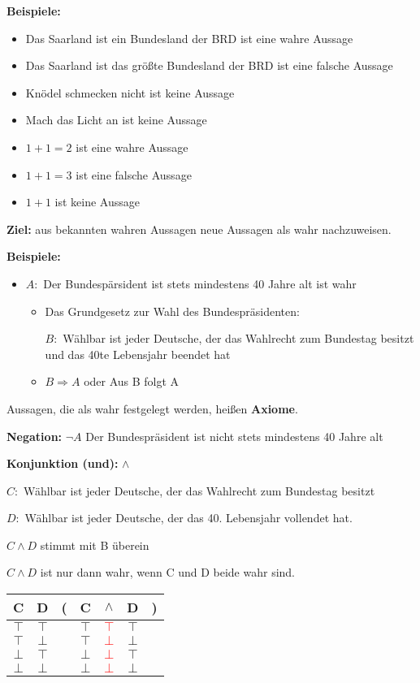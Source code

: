 \documentclass[pdftex,12pt,a4paper,fleqn]{scrartcl}
\begin{document}
\textbf{Beispiele:} 
\begin{itemize}
	\item Das Saarland ist ein Bundesland der BRD ist eine wahre Aussage
	\item Das Saarland ist das größte Bundesland der BRD ist eine falsche Aussage
	\item Knödel schmecken nicht ist keine Aussage
	\item Mach das Licht an ist  keine Aussage
	\item $1+1=2$ ist eine wahre Aussage
	\item $1+1=3$ ist eine falsche Aussage
	\item $1+1$ ist keine Aussage
\end{itemize}

\textbf{Ziel:} aus bekannten wahren Aussagen neue Aussagen als wahr nachzuweisen.

\textbf{Beispiele:}
\begin{itemize}
	\item $A:$ Der Bundespärsident ist stets mindestens 40 Jahre alt ist wahr
	\begin{itemize}
		\item Das Grundgesetz zur Wahl des Bundespräsidenten: 

		$B:$ Wählbar ist jeder Deutsche, der das Wahlrecht zum Bundestag besitzt und das 40te Lebensjahr beendet hat
		\item $B \Rightarrow A$ oder Aus B folgt A
	\end{itemize}
\end{itemize}

Aussagen, die als wahr festgelegt werden, heißen \textbf{Axiome}.

\textbf{Negation:}
$\neg A$ Der Bundespräsident ist nicht stets mindestens 40 Jahre alt

\textbf{Konjunktion (und):} $\land$ 

$C:$ Wählbar ist jeder Deutsche, der das Wahlrecht zum Bundestag besitzt

$D:$ Wählbar ist jeder Deutsche, der das 40. Lebensjahr vollendet hat.

$C \land D$ stimmt mit B überein

$C \land D$ ist nur dann wahr, wenn C und D beide wahr sind.

\begin{tabular}{@{ }c@{ }@{ }c | c@{}@{ }c@{ }@{ }c@{ }@{ }c@{ }@{}c@{ }}
C & D & ( & C & $\land$ & D & )\\
\hline 
$\top$ & $\top$ &  & $\top$ & \textcolor{red}{$\top$} & $\top$ & \\
$\top$ & $\bot$ &  & $\top$ & \textcolor{red}{$\bot$} & $\bot$ & \\
$\bot$ & $\top$ &  & $\bot$ & \textcolor{red}{$\bot$} & $\top$ & \\
$\bot$ & $\bot$ &  & $\bot$ & \textcolor{red}{$\bot$} & $\bot$ & \\
\end{tabular}
\end{document}
